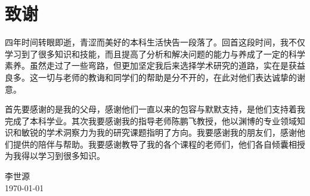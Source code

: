 
\chapter{致谢}

四年时间转眼即逝，青涩而美好的本科生活快告一段落了。回首这段时间，我不仅学习到了很多知识和技能，而且提高了分析和解决问题的能力与养成了一定的科学素养。虽然走过了一些弯路，但更加坚定我后来选择学术研究的道路，实在是获益良多。这一切与老师的教诲和同学们的帮助是分不开的，在此对他们表达诚挚的谢意。

首先要感谢的是我的父母，感谢他们一直以来的包容与默默支持，是他们支持着我完成了本科学业。其次我要感谢我的指导老师陈鹏飞教授，他以渊博的专业领域知识和敏锐的学术洞察力为我的研究课题指明了方向。我要感谢我的朋友们，感谢他们提供的陪伴与帮助。我要感谢教导了我的各个课程的老师们，他们各自倾囊相授为我得以学习到很多知识。

\vskip 108pt
\begin{flushright}
	李世源\makebox[1cm]{} \\
	\today
\end{flushright}

